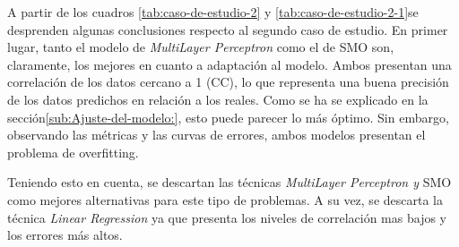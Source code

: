 \begin{table}[H]
\begin{doublespace}
\begin{centering}
\par\end{centering}
\end{doublespace}

\caption{Resultados obtenidos del caso de estudio dos \label{tab:caso-de-estudio-2-1}}
\end{table}


A partir de los cuadros \ref{tab:caso-de-estudio-2} y \ref{tab:caso-de-estudio-2-1}se
desprenden algunas conclusiones respecto al segundo caso de estudio.
En primer lugar, tanto el modelo de \emph{MultiLayer Perceptron} como
el de \ac{SMO} son, claramente, los mejores en cuanto a adaptación
al modelo. Ambos presentan una correlación de los datos cercano a
1 (\ac{CC}), lo que representa una buena precisión de los datos predichos
en relación a los reales. Como se ha se explicado en la sección\ref{sub:Ajuste-del-modelo:},
esto puede parecer lo más óptimo. Sin embargo, observando las métricas
y las curvas de errores, ambos modelos presentan el problema de overfitting. 

Teniendo esto en cuenta, se descartan las técnicas \emph{MultiLayer
Perceptron y }\ac{SMO} como mejores alternativas para este tipo de
problemas. A su vez, se descarta la técnica \emph{Linear Regression
}ya que presenta los niveles de correlación mas bajos y los errores
más altos.

